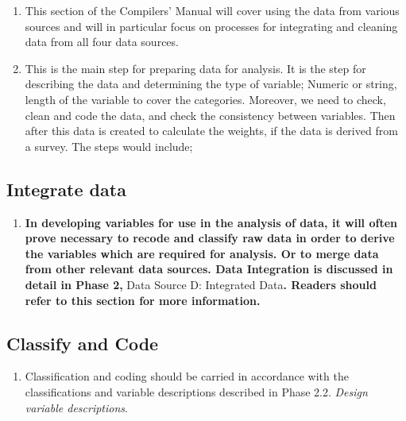 \documentclass[
]{article}
\providecommand{\tightlist}{%
  \setlength{\itemsep}{0pt}\setlength{\parskip}{0pt}}
\begin{document}
\begin{enumerate}
\def\labelenumi{\arabic{enumi}.}
\setcounter{enumi}{368}
\item
  This section of the Compilers' Manual will cover using the data
  from various sources and will in particular focus on processes for
  integrating and cleaning data from all four data sources.
\item
  This is the main step for preparing data for analysis. It is the
  step for describing the data and determining the type of variable;
  Numeric or string, length of the variable to cover the categories.
  Moreover, we need to check, clean and code the data, and check the
  consistency between variables. Then after this data is created to
  calculate the weights, if the data is derived from a survey. The
  steps would include;
\end{enumerate}

\hypertarget{integrate-data-1}{%
\subsection{Integrate data}\label{integrate-data-1}}

\begin{enumerate}
\def\labelenumi{\arabic{enumi}.}
\setcounter{enumi}{370}
\tightlist
\item
  \textbf{In developing variables for use in the analysis of data, it will
  often prove necessary to recode and classify raw data in order to
  derive the variables which are required for analysis. Or to merge
  data from other relevant data sources. Data Integration is discussed
  in detail in Phase 2,} Data Source D: Integrated Data\textbf{. Readers
  should refer to this section for more information.}
\end{enumerate}

\hypertarget{classify-and-code-1}{%
\subsection{Classify and Code}\label{classify-and-code-1}}

\begin{enumerate}
\def\labelenumi{\arabic{enumi}.}
\setcounter{enumi}{371}
\tightlist
\item
  Classification and coding should be carried in accordance with the
  classifications and variable descriptions described in Phase 2.2.
  \emph{Design variable descriptions}.
\end{enumerate}
\end{document}
